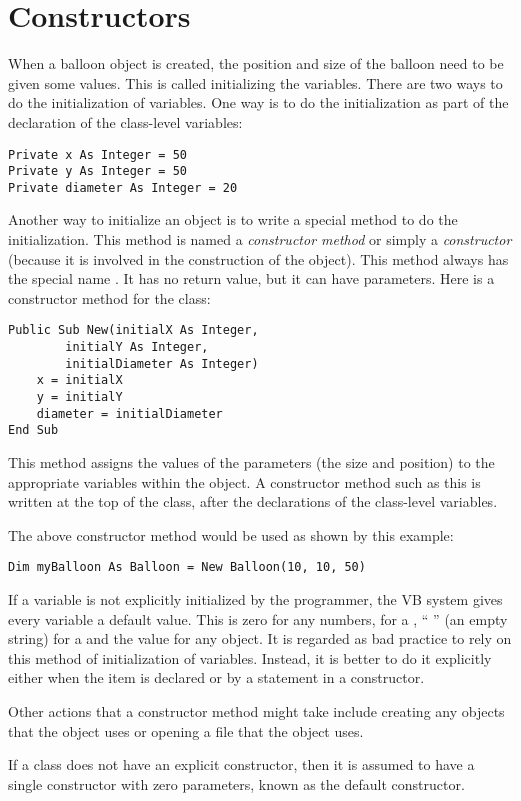 	\section{Constructors}
		When a balloon object is created, the position and size of the balloon need to be given some values. This is called initializing the variables. There are two ways to do the initialization of variables. One way is to do the initialization as part of the declaration of the class-level variables:
		\begin{lstlisting}
Private x As Integer = 50
Private y As Integer = 50
Private diameter As Integer = 20
		\end{lstlisting}
		Another way to initialize an object is to write a special method to do the initialization. This method is named a \emph{constructor method} or simply a \emph{constructor} (because it is involved in the construction of the object). This method always has the special name . It has no return value, but it can have parameters. Here is a constructor method for the  class:
		\begin{lstlisting}
Public Sub New(initialX As Integer,
		initialY As Integer,
		initialDiameter As Integer)
	x = initialX
	y = initialY
	diameter = initialDiameter
End Sub
		\end{lstlisting}
		This method assigns the values of the parameters (the size and position) to the appropriate variables within the object. A constructor method such as this is written at the top of the class, after the declarations of the class-level variables.
		
		The above constructor method would be used as shown by this example:
		\begin{lstlisting}
Dim myBalloon As Balloon = New Balloon(10, 10, 50)
		\end{lstlisting}
		If a variable is not explicitly initialized by the programmer, the VB system gives every variable a default value. This is zero for any numbers,  for a , “ ” (an empty string) for a  and the value  for any object. It is regarded as bad practice to rely on this method of initialization of variables. Instead, it is better to do it explicitly either when the item is declared or by a statement in a constructor.
		
		Other actions that a constructor method might take include creating any objects that the object uses or opening a file that the object uses.
		
		If a class does not have an explicit constructor, then it is assumed to have a single constructor with zero parameters, known as the default constructor.


